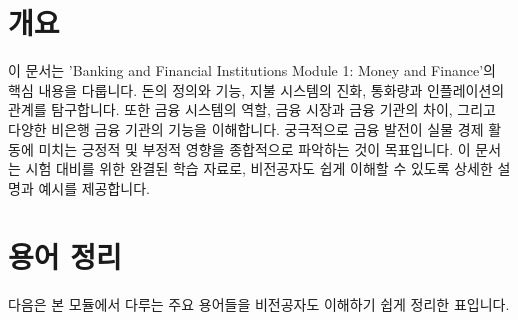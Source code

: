 \documentclass[11pt,a4paper]{article}
\begin{document}
\section*{개요}
이 문서는 'Banking and Financial Institutions Module 1: Money and Finance'의 핵심 내용을 다룹니다.
돈의 정의와 기능, 지불 시스템의 진화, 통화량과 인플레이션의 관계를 탐구합니다.
또한 금융 시스템의 역할, 금융 시장과 금융 기관의 차이, 그리고 다양한 비은행 금융 기관의 기능을 이해합니다.
궁극적으로 금융 발전이 실물 경제 활동에 미치는 긍정적 및 부정적 영향을 종합적으로 파악하는 것이 목표입니다.
이 문서는 시험 대비를 위한 완결된 학습 자료로, 비전공자도 쉽게 이해할 수 있도록 상세한 설명과 예시를 제공합니다.

\newpage
\section*{용어 정리}
다음은 본 모듈에서 다루는 주요 용어들을 비전공자도 이해하기 쉽게 정리한 표입니다.
\end{document}
